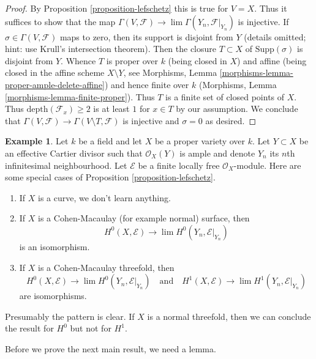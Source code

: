 \documentclass{stacks-project}
\theoremstyle{plain}
\theoremstyle{definition}
\newtheorem{example}[subsection]{Example}
\theoremstyle{remark}
\numberwithin{equation}{subsection}
\def\lim{\mathop{\mathrm{lim}}\nolimits}
\begin{document}
\begin{proof}
By Proposition \ref{proposition-lefschetz} this is true for $V = X$.
Thus it suffices to show that the map
$\Gamma(V, \mathcal{F}) \to \lim \Gamma(Y_n, \mathcal{F}|_{Y_n})$
is injective. If $\sigma \in \Gamma(V, \mathcal{F})$
maps to zero, then its support is disjoint from $Y$ (details omitted; hint:
use Krull's intersection theorem). Then the closure $T \subset X$
of $\text{Supp}(\sigma)$ is disjoint from $Y$.
Whence $T$ is proper over $k$ (being closed in $X$)
and affine (being closed in the affine scheme $X \setminus Y$, see
Morphisms, Lemma \ref{morphisms-lemma-proper-ample-delete-affine})
and hence finite over $k$
(Morphisms, Lemma \ref{morphisms-lemma-finite-proper}).
Thus $T$ is a finite set of closed points of $X$.
Thus $\text{depth}(\mathcal{F}_x) \geq 2$ is at least $1$
for $x \in T$ by our assumption. We conclude that
$\Gamma(V, \mathcal{F}) \to \Gamma(V \setminus T, \mathcal{F})$
is injective and $\sigma = 0$ as desired.
\end{proof}


\begin{example}
\label{example-lefschetz}
Let $k$ be a field and let $X$ be a proper variety over $k$.
Let $Y \subset X$ be an effective Cartier divisor such that
$\mathcal{O}_X(Y)$ is ample and
denote $Y_n$ its $n$th infinitesimal neighbourhood.
Let $\mathcal{E}$ be a finite locally free $\mathcal{O}_X$-module.
Here are some special cases of Proposition \ref{proposition-lefschetz}.
\begin{enumerate}
\item If $X$ is a curve, we don't learn anything.
\item If $X$ is a Cohen-Macaulay (for example normal) surface, then
$$
H^0(X, \mathcal{E}) \to \lim H^0(Y_n, \mathcal{E}|_{Y_n})
$$
is an isomorphism.
\item If $X$ is a Cohen-Macaulay threefold, then
$$
H^0(X, \mathcal{E}) \to \lim H^0(Y_n, \mathcal{E}|_{Y_n})
\quad\text{and}\quad
H^1(X, \mathcal{E}) \to \lim H^1(Y_n, \mathcal{E}|_{Y_n})
$$
are isomorphisms.
\end{enumerate}
Presumably the pattern is clear. If $X$ is a normal threefold, then
we can conclude the result for $H^0$ but not for $H^1$.
\end{example}

\noindent
Before we prove the next main result, we need a lemma.
\end{document}
